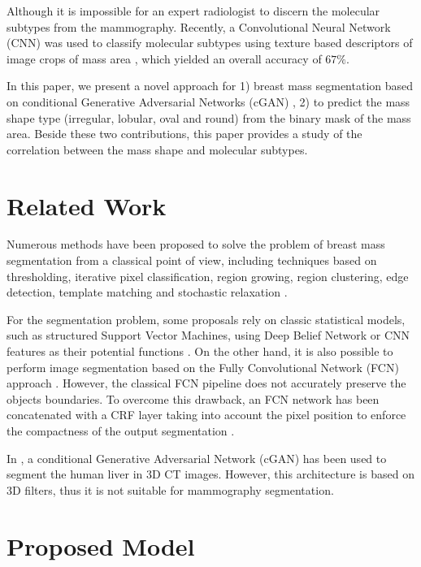 \documentclass[runningheads,a4paper]{llncs}
\begin{document}
Although it is impossible for an expert radiologist to discern the molecular subtypes from the mammography. Recently, a Convolutional Neural Network (CNN) was used to classify molecular subtypes using texture based descriptors of image crops of mass area \cite{Singh17CCIA}, which yielded an overall accuracy of $67\%$. 

In this paper, we present a novel approach for 1) breast mass segmentation based on conditional Generative Adversarial Networks (cGAN) \cite{isola2017image}, 2) to predict the mass shape type (irregular, lobular, oval and round) from the binary mask of the mass area. Beside these two contributions, this paper provides a study of the correlation between the mass shape and molecular subtypes.

\section{Related Work}

Numerous methods have been proposed to solve the problem of breast mass segmentation from a classical point of view, including techniques based on thresholding, iterative pixel classification, region growing, region clustering, edge detection, template matching and stochastic relaxation \cite{ChengSMHCD06,oliver2010review}.  

For the segmentation problem, some proposals rely on classic statistical models, such as structured Support Vector Machines, using Deep Belief Network or CNN features as their potential functions \cite{dhungel2015deep}. On the other hand, it is also possible to perform image segmentation based on the Fully Convolutional Network (FCN) approach \cite{long2015fully}. However, the classical FCN pipeline does not accurately preserve the objects boundaries. To overcome this drawback, an FCN network has been concatenated with a CRF layer taking into account the pixel position to enforce the compactness of the output segmentation \cite{zhu2016adversarial}.

In \cite{yang2017automatic}, a conditional Generative Adversarial Network (cGAN) has been used to segment the human liver in 3D CT images. However, this architecture is based on 3D filters, thus it is not suitable for mammography segmentation.


\section{Proposed Model}
\end{document}
